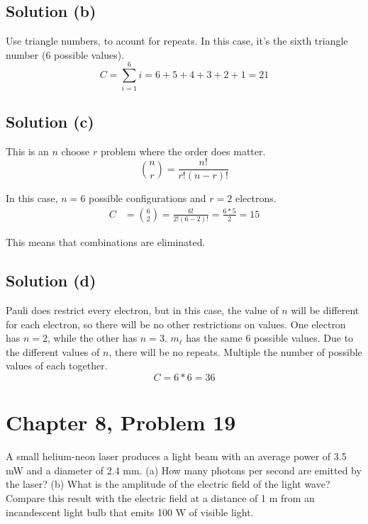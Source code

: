 \documentclass[12pt]{article}
\begin{document}
        \subsection{Solution (b)}
            Use triangle numbers, to acount for repeats.
            In this case, it's the sixth triangle number (6 possible values).
            \begin{equation}
                C = \sum_{i = 1}^{6} i = 6+5+4+3+2+1 = \boxed{21}
            \end{equation}
        
        \subsection{Solution (c)}
            This is an $n$ choose $r$ problem where the order does matter. 
            \begin{equation}
                \binom{n}{r} = \frac{n!}{r!(n - r)!}
            \end{equation}

            In this case, $n = 6$ possible configurations and $r = 2$ electrons.
            \begin{align}
                C   &=  \binom{6}{2} 
                    =   \frac{6!}{2!(6 - 2)!}
                    =   \frac{6 * 5}{2}
                    =   15
            \end{align}

            This means that  combinations are eliminated.

        \subsection{Solution (d)}
            Pauli does restrict every electron, but in this case, the value of $n$ will be different for each electron, so there will be no other restrictions on values.
            One electron has $n = 2$, while the other has $n = 3$.
            $m_\ell$ has the same 6 possible values. 
            Due to the different values of $n$, there will be no repeats. 
            Multiple the number of possible values of each together.
            \begin{equation}
                C = 6 * 6 = \boxed{36}
            \end{equation}
    \pagebreak
    
    \section{Chapter 8, Problem 19}
        A small helium-neon laser produces a light beam with an average power of 3.5 mW and a diameter of 2.4 mm.
        (a) How many photons per second are emitted by the laser?
        (b) What is the amplitude of the electric ﬁeld of the light wave? Compare this result with the electric ﬁeld at a distance of 1 m from an incandescent light bulb that emits 100 W of visible light.
\end{document}

